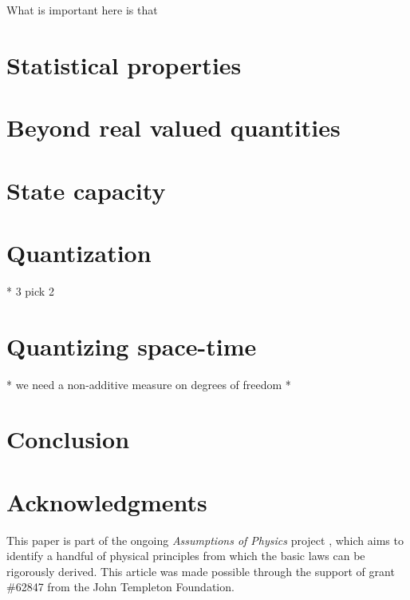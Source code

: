 \documentclass[10pt,twocolumn, nofootinbib]{revtex4-2}
\begin{document}
What is important here is that 


\section{Statistical properties}

\section{Beyond real valued quantities}


\section{State capacity}

\section{Quantization}
* 3 pick 2

\section{Quantizing space-time}
* we need a non-additive measure on degrees of freedom
*

\section{Conclusion}



\section*{Acknowledgments}
This paper is part of the ongoing \textit{Assumptions of Physics} project \cite{aop-book}, which aims to identify a handful of physical principles from which the basic laws can be rigorously derived. This article was made possible through the support of grant \#62847 from the John Templeton Foundation.




\newcommand{\pj}[1] {\underbar{$#1$}}
\end{document}
